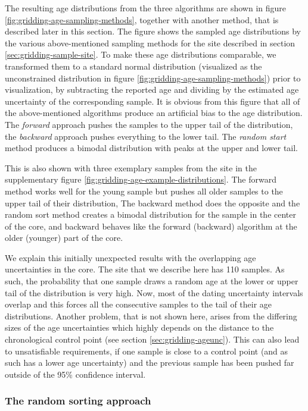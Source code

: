 \documentclass[
11pt, %
english, %
singlespacing, %
headsepline, %
]{MastersDoctoralThesis} %
\begin{document}
\begin{NoHyper}
\begin{refsection}
The resulting age distributions from the three algorithms are shown in figure \ref{fig:gridding-age-sampling-methods}, together with another method, that is described later in this section. The figure shows the sampled age distributions by the various above-mentioned sampling methods for the site described in section \ref{sec:gridding-sample-site}. To make these age distributions comparable, we transformed them to a standard normal distribution (visualized as the unconstrained distribution in figure \ref{fig:gridding-age-sampling-methods}) prior to visualization, by subtracting the reported age and dividing by the estimated age uncertainty of the corresponding sample. It is obvious from this figure that all of the above-mentioned algorithms produce an artificial bias to the age distribution. The \textit{forward} approach pushes the samples to the upper tail of the distribution, the \textit{backward} approach pushes everything to the lower tail. The \textit{random start} method produces a bimodal distribution with peaks at the upper and lower tail.

This is also shown with three exemplary samples from the site in the supplementary figure \ref{fig:gridding-age-example-distributions}. The forward method works well for the young sample but pushes all older samples to the upper tail of their distribution, The backward method does the opposite and the random sort method creates a bimodal distribution for the sample in the center of the core, and backward behaves like the forward (backward) algorithm at the older (younger) part of the core.

We explain this initially unexpected results with the overlapping age uncertainties in the core. The site that we describe here has 110 samples. As such, the probability that one sample draws a random age at the lower or upper tail of the distribution is very high. Now, most of the dating uncertainty intervals overlap and this forces all the consecutive samples to the tail of their age distributions. Another problem, that is not shown here, arises from the differing sizes of the age uncertainties which highly depends on the distance to the chronological control point (see section \ref{sec:gridding-ageunc}). This can also lead to unsatisfiable requirements, if one sample is close to a control point (and as such has a lower age uncertainty) and the previous sample has been pushed far outside of the 95\% confidence interval.


\subsubsection{The random sorting approach}


\end{refsection}
\end{NoHyper}
\end{document}
